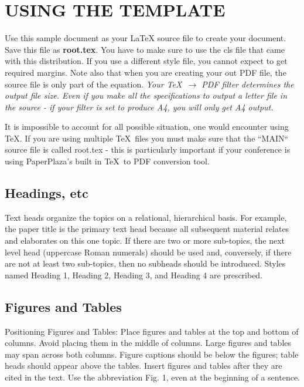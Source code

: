 \documentclass[letterpaper, 10 pt, conference]{ieeeconf}  %
\begin{document}
\section{USING THE TEMPLATE}

Use this sample document as your LaTeX source file to create your document. Save this file as {\bf root.tex}. You have to make sure to use the cls file that came with this distribution. If you use a different style file, you cannot expect to get required margins. Note also that when you are creating your out PDF file, the source file is only part of the equation. {\it Your \TeX\ $\rightarrow$ PDF filter determines the output file size. Even if you make all the specifications to output a letter file in the source - if your filter is set to produce A4, you will only get A4 output. }

It is impossible to account for all possible situation, one would encounter using \TeX. If you are using multiple \TeX\ files you must make sure that the ``MAIN`` source file is called root.tex - this is particularly important if your conference is using PaperPlaza's built in \TeX\ to PDF conversion tool.

\subsection{Headings, etc}

Text heads organize the topics on a relational, hierarchical basis. For example, the paper title is the primary text head because all subsequent material relates and elaborates on this one topic. If there are two or more sub-topics, the next level head (uppercase Roman numerals) should be used and, conversely, if there are not at least two sub-topics, then no subheads should be introduced. Styles named Heading 1, Heading 2, Heading 3, and Heading 4 are prescribed.

\subsection{Figures and Tables}

Positioning Figures and Tables: Place figures and tables at the top and bottom of columns. Avoid placing them in the middle of columns. Large figures and tables may span across both columns. Figure captions should be below the figures; table heads should appear above the tables. Insert figures and tables after they are cited in the text. Use the abbreviation Fig. 1, even at the beginning of a sentence.
\end{document}

